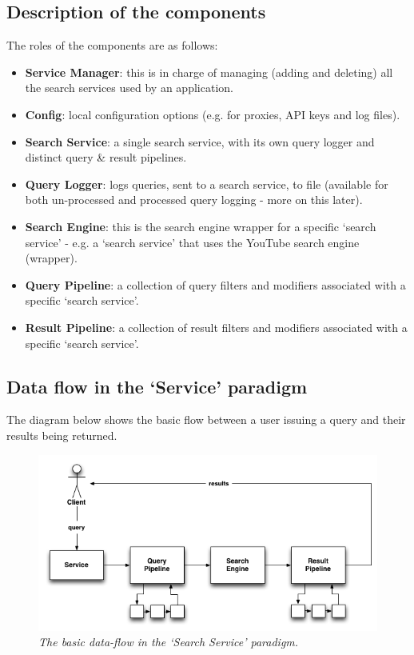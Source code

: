 \documentclass[letterpaper,10pt,english]{sphinxmanual}
\begin{document}
\subsection{Description of the components}
\label{service:description-of-the-components}
The roles of the components are as follows:
\begin{itemize}
\item {} 
\textbf{Service Manager}: this is in charge of managing (adding and deleting) all the search services used by an application.

\item {} 
\textbf{Config}: local configuration options (e.g. for proxies, API keys and log files).

\item {} 
\textbf{Search Service}: a single search service, with its own query logger and distinct query \& result pipelines.

\item {} 
\textbf{Query Logger}: logs queries, sent to a search service, to file (available for both un-processed and processed query logging - more on this later).

\item {} 
\textbf{Search Engine}:  this is the search engine wrapper for a specific `search service' - e.g. a `search service' that uses the YouTube search engine (wrapper).

\item {} 
\textbf{Query Pipeline}: a collection of query filters and modifiers associated with a specific `search service'.

\item {} 
\textbf{Result Pipeline}: a collection of result filters and modifiers associated with a specific `search service'.

\end{itemize}


\subsection{Data flow in the `Service' paradigm}
\label{service:data-flow-in-the-service-paradigm}
The diagram below shows the basic flow between a user issuing a query and their results being returned.
\begin{figure}[htbp]
\centering
\capstart

\includegraphics{puppy-pipelines.png}
\caption{\emph{The basic data-flow in the `Search Service' paradigm.}}\end{figure}
\end{document}
